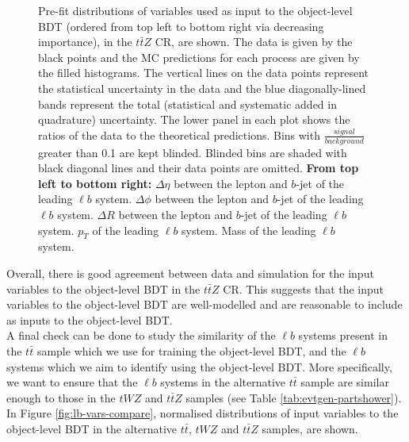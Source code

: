 \begin{figure}[htbp]
\caption{Pre-fit distributions of variables used as input to the object-level BDT (ordered from top left to bottom right via decreasing importance), in the $t\bar{t}Z$ CR, are shown. The data is given by the black points and the MC predictions for each process are given by the filled histograms. The vertical lines on the data points represent the statistical uncertainty in the data and the blue diagonally-lined bands represent the total (statistical and systematic added in quadrature) uncertainty. The lower panel in each plot shows the ratios of the data to the theoretical predictions. Bins with $\frac{signal}{background}$ greater than 0.1 are kept blinded. Blinded bins are shaded with black diagonal lines and their data points are omitted. \textbf{From top left to bottom right:} $\Delta \eta$ between the lepton and $b$-jet of the leading $\ell b$ system. $\Delta \phi$ between the lepton and $b$-jet of the leading $\ell b$ system. $\Delta R$ between the lepton and $b$-jet of the leading $\ell b$ system. $p_{T}$ of the leading $\ell b$ system. Mass of the leading $\ell b$ system.}
  \label{fig:4lep-ttZCR-objectbdt-vars}
\end{figure}

Overall, there is good agreement between data and simulation for the input variables to the object-level BDT in the $t\bar{t}Z$ CR. This suggests that the input variables to the object-level BDT are well-modelled and are reasonable to include as inputs to the object-level BDT. \\

A final check can be done to study the similarity of the $\ell b$ systems present in the $t\bar{t}$ sample which we use for training the object-level BDT, and the $\ell b$ systems which we aim to identify using the object-level BDT. More specifically, we want to ensure that the $\ell b$ systems in the alternative $t\bar{t}$ sample are similar enough to those in the $tWZ$ and $t\bar{t}Z$ samples (see Table \ref{tab:evtgen-partshower}). In Figure \ref{fig:lb-vars-compare}, normalised distributions of input variables to the object-level BDT in the alternative $t\bar{t}$, $tWZ$ and $t\bar{t}Z$ samples, are shown.


